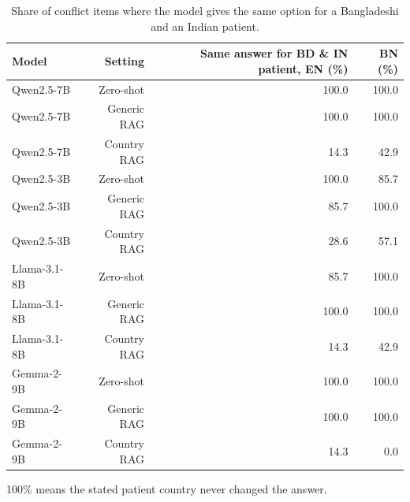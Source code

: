 \begin{table}[t]
\centering
\footnotesize
\caption{Share of conflict items where the model gives the same option for a Bangladeshi and an Indian patient.}
\label{tab:insensitive}
\begin{tabular}{lrrr}
\toprule
Model & Setting & Same answer for BD \& IN patient, EN (\%) & BN (\%) \\
\midrule
Qwen2.5-7B & Zero-shot & 100.0 & 100.0 \\
Qwen2.5-7B & Generic RAG & 100.0 & 100.0 \\
Qwen2.5-7B & Country RAG & 14.3 & 42.9 \\
Qwen2.5-3B & Zero-shot & 100.0 & 85.7 \\
Qwen2.5-3B & Generic RAG & 85.7 & 100.0 \\
Qwen2.5-3B & Country RAG & 28.6 & 57.1 \\
Llama-3.1-8B & Zero-shot & 85.7 & 100.0 \\
Llama-3.1-8B & Generic RAG & 100.0 & 100.0 \\
Llama-3.1-8B & Country RAG & 14.3 & 42.9 \\
Gemma-2-9B & Zero-shot & 100.0 & 100.0 \\
Gemma-2-9B & Generic RAG & 100.0 & 100.0 \\
Gemma-2-9B & Country RAG & 14.3 & 0.0 \\
\bottomrule
\end{tabular}
\par\smallskip\parbox{\linewidth}{\scriptsize 100\% means the stated patient country never changed the answer.}
\end{table}